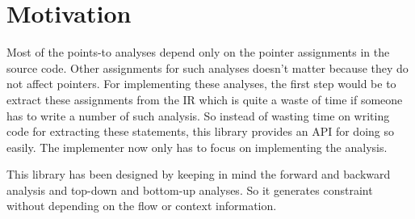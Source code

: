 \section{Motivation}

Most of the points-to analyses depend only on the pointer assignments in
the source code. Other assignments for such analyses doesn't matter because
they do not affect pointers. For implementing these analyses, the
first step would be to extract these assignments from the IR which is quite a 
waste of time if someone has to write a number of such analysis. So instead of
wasting time on writing code for extracting these statements, this library 
provides an API for doing so easily. The implementer now only has to focus on 
implementing the analysis.

This library has been designed by keeping in mind the forward and backward
analysis and top-down and bottom-up analyses. So it generates constraint
without depending on the flow or context information.

